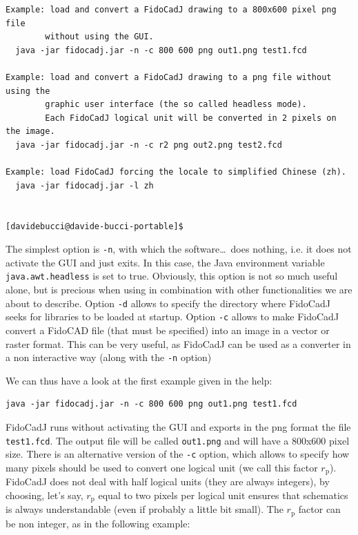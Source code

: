 \documentclass[10pt,a4paper,twoside]{scrreprt}
\begin{document}
\begin{lstlisting}
Example: load and convert a FidoCadJ drawing to a 800x600 pixel png file
        without using the GUI.
  java -jar fidocadj.jar -n -c 800 600 png out1.png test1.fcd

Example: load and convert a FidoCadJ drawing to a png file without using the
        graphic user interface (the so called headless mode).
        Each FidoCadJ logical unit will be converted in 2 pixels on the image.
  java -jar fidocadj.jar -n -c r2 png out2.png test2.fcd

Example: load FidoCadJ forcing the locale to simplified Chinese (zh).
  java -jar fidocadj.jar -l zh


[davidebucci@davide-bucci-portable]$
\end{lstlisting}
\lstset{language=FIDOCAD,
    basicstyle=\small\ttfamily}

The simplest option is \lstinline!-n!, with which the software\dots\ does nothing, i.e. it does not activate the GUI and just exits. In this case, the Java environment variable \lstinline!java.awt.headless! is set to true.
Obviously, this option is not so much useful alone, but is precious when using in combination with other functionalities we are about to describe.
Option \lstinline!-d! allows to specify the directory where FidoCadJ seeks for libraries to be loaded at startup. Option \lstinline!-c! allows to make FidoCadJ convert a FidoCAD file (that must be specified) into an image in a vector or raster format. This can be very useful, as FidoCadJ can be used as a converter in a non interactive way (along with the \lstinline!-n! option)

We can thus have a look at the first example given in the help:

\begin{lstlisting}
java -jar fidocadj.jar -n -c 800 600 png out1.png test1.fcd
\end{lstlisting}

FidoCadJ runs without activating the GUI and exports in the png format the file \lstinline!test1.fcd!. The output file will be called \lstinline!out1.png! and will have a 800x600 pixel size.
There is an alternative version of the  \lstinline!-c! option, which allows to specify how many pixels should be used to convert one logical unit (we call this factor $r_\mathrm{p}$). FidoCadJ does not deal with half logical units (they are always integers), by choosing, let's say, $r_\mathrm{p}$ equal to two pixels per logical unit ensures that schematics is always understandable (even if probably a little bit small). The $r_\mathrm{p}$ factor can be non integer, as in the following example:
\end{document}
